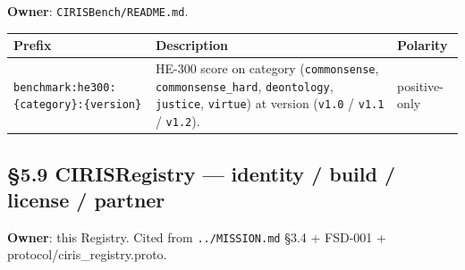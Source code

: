 \documentclass[11pt]{article}
\begin{document}
\textbf{Owner}: \texttt{CIRISBench/README.md}.


{\footnotesize
\begin{longtable}{|p{5.33cm}|p{5.33cm}|p{5.33cm}|}\hline
\textbf{Prefix} & \textbf{Description} & \textbf{Polarity} \\ \hline\endhead
\texttt{benchmark:he300:\{category\}:\{version\}} & HE-300 score on category (\texttt{commonsense}, \texttt{commonsense\_hard}, \texttt{deontology}, \texttt{justice}, \texttt{virtue}) at version (\texttt{v1.0} / \texttt{v1.1} / \texttt{v1.2}). & positive-only \\ \hline
\end{longtable}}


\subsection*{§5.9 CIRISRegistry — identity / build / license / partner}


\textbf{Owner}: this Registry. Cited from \texttt{../MISSION.md} §3.4 + FSD-001 + protocol/ciris\_registry.proto.
\end{document}
